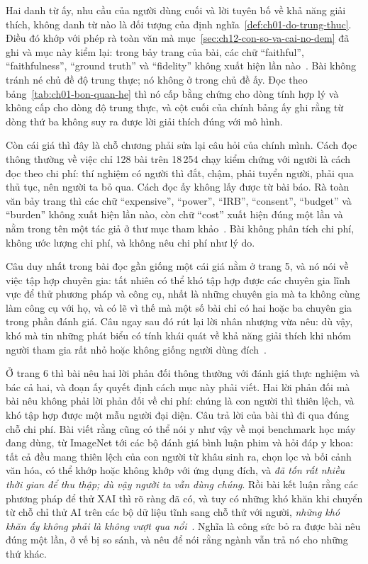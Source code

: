%
Hai danh từ ấy, nhu cầu của người dùng cuối và lời tuyên bố về khả năng giải
thích, không danh từ nào là đối tượng của định
nghĩa~\ref{def:ch01-do-trung-thuc}. Điều đó khớp với phép rà toàn văn mà
mục~\ref{sec:ch12-con-so-va-cai-no-dem} đã ghi và mục này kiểm lại: trong bảy
trang của bài, các chữ \enquote{faithful}, \enquote{faithfulness},
\enquote{ground truth} và \enquote{fidelity} không xuất hiện lần
nào~\autocite{p24humangap}. Bài không tránh né chủ đề độ trung thực; nó không ở
trong chủ đề ấy. Đọc theo bảng~\ref{tab:ch01-bon-quan-he} thì nó cấp bằng chứng
cho dòng tính hợp lý và không cấp cho dòng độ trung thực, và cột cuối của chính
bảng ấy ghi rằng từ dòng thứ ba không suy ra được lời giải thích đúng với mô
hình.

%
Còn cái giá thì đây là chỗ chương phải sửa lại câu hỏi của chính mình. Cách đọc
thông thường về việc chỉ 128 bài trên 18\,254 chạy kiểm chứng với người là cách
đọc theo chi phí: thí nghiệm có người thì đắt, chậm, phải tuyển người, phải qua
thủ tục, nên người ta bỏ qua. Cách đọc ấy không lấy được từ bài báo. Rà toàn văn
bảy trang thì các chữ \enquote{expensive}, \enquote{power}, \enquote{IRB},
\enquote{consent}, \enquote{budget} và \enquote{burden} không xuất hiện lần nào,
còn chữ \enquote{cost} xuất hiện đúng một lần và nằm trong tên một tác giả ở
thư mục tham khảo~\autocite{p24humangap}. Bài không phân tích chi phí, không ước
lượng chi phí, và không nêu chi phí như lý do.

Câu duy nhất trong bài đọc gần giống một cái giá nằm ở trang 5, và nó nói về
việc tập hợp chuyên gia: tất nhiên có thể khó tập hợp được các chuyên gia lĩnh
vực để thử phương pháp và công cụ, nhất là những chuyên gia mà ta không cùng làm
công cụ với họ, và có lẽ vì thế mà một số bài chỉ có hai hoặc ba chuyên gia
trong phần đánh giá. Câu ngay sau đó rút lại lời nhân nhượng vừa nêu: dù vậy, khó mà
tin những phát biểu có tính khái quát về khả năng giải thích khi nhóm người tham
gia rất nhỏ hoặc không giống người dùng đích~\autocite{p24humangap}.

%
Ở trang 6 thì bài nêu hai lời phản đối thông thường với đánh giá thực nghiệm và
bác cả hai, và đoạn ấy quyết định cách mục này phải viết. Hai lời phản đối mà
bài nêu không phải lời phản đối về chi phí: chúng là con người thì thiên lệch,
và khó tập hợp được một mẫu người đại diện. Câu trả lời của bài thì đi qua đúng
chỗ chi phí. Bài viết rằng cũng có thể nói y như vậy về mọi benchmark học máy
đang dùng, từ ImageNet tới các bộ đánh giá bình luận phim và hỏi đáp y khoa: tất
cả đều mang thiên lệch của con người từ khâu sinh ra, chọn lọc và bối cảnh văn
hóa, có thể khớp hoặc không khớp với ứng dụng đích, và \emph{đã tốn rất nhiều
thời gian để thu thập; dù vậy người ta vẫn dùng chúng}. Rồi bài kết luận rằng
các phương pháp để thử XAI thì rõ ràng đã có, và tuy có những khó khăn khi
chuyển từ chỗ chỉ thử AI trên các bộ dữ liệu tĩnh sang chỗ thử với người,
\emph{những khó khăn ấy không phải là không vượt qua nổi}~\autocite{p24humangap}.
Nghĩa là công sức bỏ ra được bài nêu đúng một lần, ở vế bị so sánh, và nêu để
nói rằng ngành vẫn trả nó cho những thứ khác.

